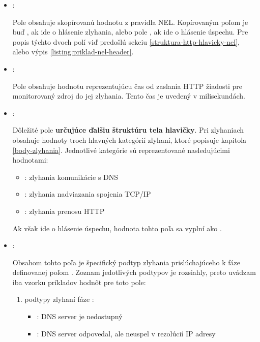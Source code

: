 \begin{itemize}
    \item {}:

    Pole obsahuje skopírovanú hodnotu z pravidla NEL. Kopírovaným poľom je buď , ak ide o hlásenie zlyhania, alebo pole , ak ide o hlásenie úspechu.
    Pre popis týchto dvoch polí viď predošlú sekciu \ref{struktura-http-hlavicky-nel}, alebo výpis \ref{listing:priklad-nel-header}.
    
    \item {}:

    Pole obsahuje hodnotu reprezentujúcu čas od zaslania HTTP žiadosti pre monitorovaný zdroj do jej zlyhania.
    Tento čas je uvedený v milisekundách.
    
    \item {}:

    Dôležité pole \textbf{určujúce ďalšiu štruktúru tela hlavičky}.
    Pri zlyhaniach obsahuje hodnoty troch hlavných kategórií zlyhaní, ktoré popisuje kapitola \ref{body-zlyhania}.
    Jednotlivé kategórie sú reprezentované nasledujúcimi hodnotami: 
    \begin{itemize}
        \item {}: zlyhania komunikácie s DNS
        \item {}: zlyhania nadviazania spojenia TCP/IP
        \item {}: zlyhania prenosu HTTP
    \end{itemize}

    Ak však ide o hlásenie úspechu, hodnota tohto poľa sa vyplní ako .

    \pagebreak
    
    \item {}:

    Obsahom tohto poľa je špecifický podtyp zlyhania prislúchajúceho k fáze definovanej poľom .
    Zoznam jedotlivých podtypov je rozsiahly, preto uvádzam iba vzorku príkladov hodnôt pre toto pole:
    \begin{enumerate}
        \item podtypy zlyhaní fáze :
        \begin{itemize}
            \item {}: DNS server je nedostupný
            \item {}: DNS server odpovedal, ale neuspel v rezolúcií IP adresy
        \end{itemize}
        

\end{enumerate}
\end{itemize}
